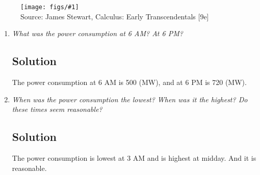 \documentclass[11pt]{article}
\newcommand{\soln}{\subsection*}
\newcommand{\qn}{\textit}
\newcommand{\imagesource}[1]{{\footnotesize Source: #1}}
\newcommand{\img}[1]{
	\begin{figure}[h]
		\centering
		\texttt{[image: figs/\#1]}\\
		\imagesource{James Stewart, Calculus: Early Transcendentals [9e]}
	\end{figure}
}
\begin{document}
\img{1.1.23}

\begin{enumerate}
	\item \qn{What was the power consumption at 6 AM? At 6 PM?}
	\soln{Solution}
	The power consumption at 6 AM is 500 (MW), and at 6 PM is 720 (MW).
	
	\item \qn{When was the power consumption the lowest? When was it the highest? Do these times seem reasonable?}
	\soln{Solution}
	The power consumption is lowest at 3 AM and is highest at midday. And it is reasonable.
\end{enumerate}
\end{document}
